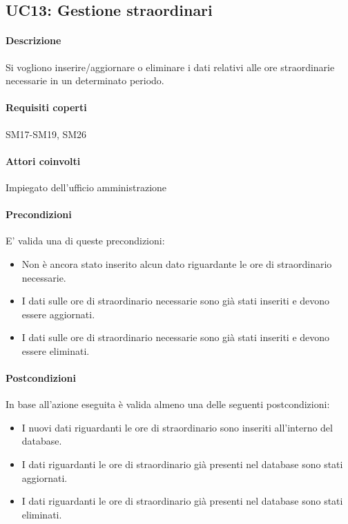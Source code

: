 \subsection{UC13: Gestione straordinari}
\paragraph{Descrizione}
Si vogliono inserire/aggiornare o eliminare i dati relativi alle ore straordinarie necessarie in un determinato periodo.
\paragraph{Requisiti coperti}
SM17-SM19, SM26
\paragraph{Attori coinvolti}
Impiegato dell'ufficio amministrazione
\paragraph{Precondizioni}
E' valida una di queste precondizioni:
\begin{itemize}
	\item Non è ancora stato inserito alcun dato riguardante le ore di straordinario necessarie.
	\item I dati sulle ore di straordinario necessarie sono già stati inseriti e devono essere aggiornati.
	\item I dati sulle ore di straordinario necessarie sono già stati inseriti e devono essere eliminati.
\end{itemize}
\paragraph{Postcondizioni}
In base all'azione eseguita è valida almeno una delle seguenti postcondizioni:
\begin{itemize}
	\item I nuovi dati riguardanti le ore di straordinario sono inseriti all'interno del database.
	\item I dati riguardanti le ore di straordinario già presenti nel database sono stati aggiornati.
	\item I dati riguardanti le ore di straordinario già presenti nel database sono stati eliminati.
\end{itemize}
